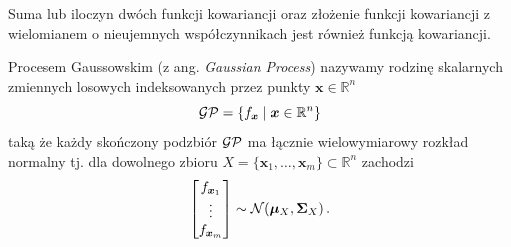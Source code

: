 \documentclass{myclass}
\numberwithin{equation}{subsection}
\begin{document}
\begin{theorem}
Suma lub iloczyn dwóch funkcji kowariancji oraz złożenie funkcji kowariancji z wielomianem o
nieujemnych współczynnikach jest również funkcją kowariancji.
\end{theorem}

\begin{definition}
Procesem Gaussowskim (z ang. \textit{Gaussian Process}) nazywamy rodzinę skalarnych zmiennych
losowych indeksowanych przez punkty \(\bm{x} \in \mathbb{R}^n\)
\begin{equation*}
    \mathcal{GP} = \left\{f_{\bm{x}} \mid \bm{x} \in \mathbb{R}^n\right\}
\end{equation*}
taką że każdy skończony podzbiór \(\mathcal{GP}\) ma łącznie wielowymiarowy rozkład normalny tj. dla
dowolnego zbioru \(X = \{\bm{x}_1, \ldots, \bm{x}_m\} \subset \mathbb{R}^n\) zachodzi
\begin{equation*}
    \mqty[f_{\bm{x}_1} \\ \vdots \\ f_{\bm{x}_m}] \sim \mc{N}(\bm{\mu}_X, \bm{\Sigma}_{X})\,.
\end{equation*}
\end{definition}
\end{document}
